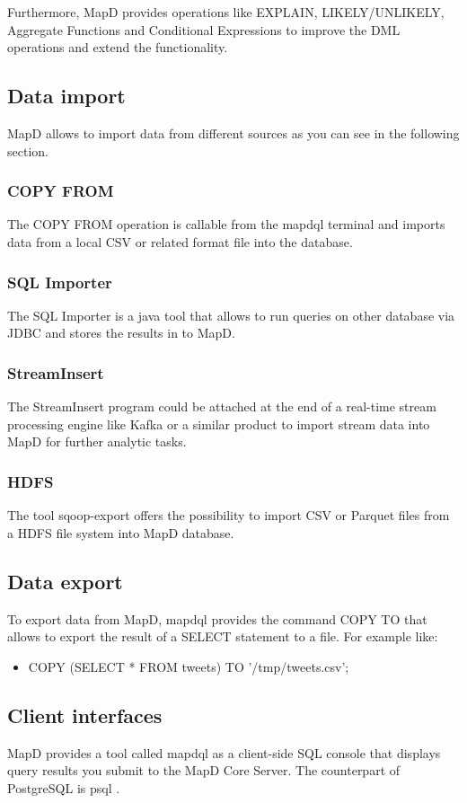 Furthermore, MapD provides operations like EXPLAIN, LIKELY/UNLIKELY, Aggregate Functions and Conditional Expressions to improve the DML operations and extend the functionality.

\subsection{Data import}
MapD allows to import data from different sources as you can see in the following section.

\subsubsection{COPY FROM}
The COPY FROM operation is callable from the mapdql terminal and imports data from a local CSV or related format file into the database.

\subsubsection{SQL Importer}
The SQL Importer is a java tool that allows to run queries on other database via JDBC and stores the results in to MapD.

\subsubsection{StreamInsert}
The StreamInsert program could be attached at the end of a real-time stream processing engine like Kafka or a similar product to import stream data into MapD for further analytic tasks.

\subsubsection{HDFS}
The tool sqoop-export offers the possibility to import CSV or Parquet files from a HDFS file system into MapD database.

\subsection{Data export}
To export data from MapD, mapdql provides the command COPY TO that allows to export the result of a SELECT statement to a file.
For example like:
\begin{itemize}
 \item COPY (SELECT * FROM tweets) TO '/tmp/tweets.csv';
\end{itemize}


\newpage
\subsection{Client interfaces}
MapD provides a tool called mapdql \cite{mapdql} as a client-side SQL console that displays query results you submit to the MapD Core Server.
The counterpart of PostgreSQL is psql \cite{psql}.

